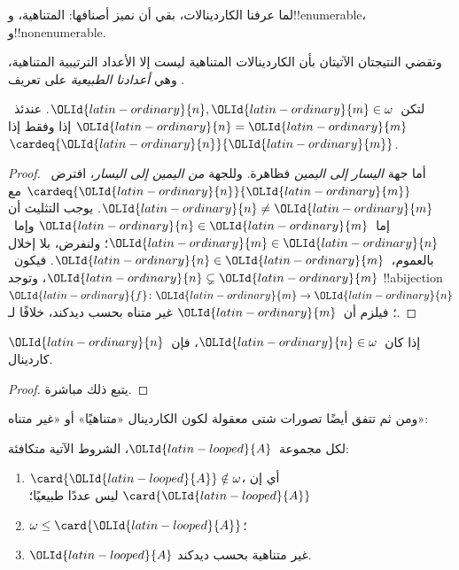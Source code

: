 \documentclass[../../../include/open-logic-section]{subfiles}
\begin{document}

لما عرفنا الكاردينالات، بقي أن نميز أصنافها: المتناهية،
و!!{enumerable}، و!!{nonenumerable}.

وتقضي النتيجتان الآتيتان بأن الكاردينالات المتناهية ليست إلا الأعداد
الترتيبية المتناهية، وهي \emph{أعدادنا الطبيعية} على تعريف
.

\begin{prop}
لتكن~${\OLId{latin-ordinary}{n}}, {\OLId{latin-ordinary}{m}} \in \omega$. عندئذ~${\OLId{latin-ordinary}{n}} = {\OLId{latin-ordinary}{m}}$ إذا وفقط إذا
$\cardeq{{\OLId{latin-ordinary}{n}}}{{\OLId{latin-ordinary}{m}}}$.
\end{prop}

\begin{proof}
أما جهة \emph{اليسار إلى اليمين} فظاهرة. وللجهة
\emph{من اليمين إلى اليسار}، افترض~$\cardeq{{\OLId{latin-ordinary}{n}}}{{\OLId{latin-ordinary}{m}}}$ مع
${\OLId{latin-ordinary}{n}} \neq {\OLId{latin-ordinary}{m}}$. يوجب التثليث أن إما~${\OLId{latin-ordinary}{n}} \in {\OLId{latin-ordinary}{m}}$ وإما~${\OLId{latin-ordinary}{m}} \in {\OLId{latin-ordinary}{n}}$؛ ولنفرض،
بلا إخلال بالعموم،~${\OLId{latin-ordinary}{n}} \in {\OLId{latin-ordinary}{m}}$. فيكون~${\OLId{latin-ordinary}{n}} \subsetneq {\OLId{latin-ordinary}{m}}$، وتوجد
!!a{bijection}~${\OLId{latin-ordinary}{f}} \colon {\OLId{latin-ordinary}{m}} \to {\OLId{latin-ordinary}{n}}$؛ فيلزم أن~${\OLId{latin-ordinary}{m}}$ غير متناه بحسب
ديدكند، خلافًا لـ.
\end{proof}

\begin{cor}
إذا كان~${\OLId{latin-ordinary}{n}} \in \omega$، فإن~${\OLId{latin-ordinary}{n}}$ كاردينال.
\end{cor}

\begin{proof}
يتبع ذلك مباشرة.
\end{proof}
\noindent
ومن ثم تتفق أيضًا تصورات شتى معقولة لكون الكاردينال «متناهيًا» أو
«غير متناه»:
\begin{thm}لكل مجموعة~${\OLId{latin-looped}{A}}$، الشروط الآتية متكافئة:
\begin{enumerate}
	\item{} $\card{{\OLId{latin-looped}{A}}} \notin \omega$، أي إن
	$\card{{\OLId{latin-looped}{A}}}$ ليس عددًا طبيعيًا؛
	\item{} $\omega \leq \card{{\OLId{latin-looped}{A}}}$؛
	\item{} ${\OLId{latin-looped}{A}}$ غير متناهية بحسب ديدكند.
\end{enumerate}
\end{thm}
\end{document}
